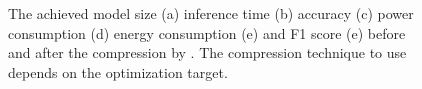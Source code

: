 \begin{figure}[!t]
\centering
{}
\hfill
{}
\hfill
{}
\hfill
{}
\hfill
{}
\hfill

\caption{The achieved model size (a) inference time (b) accuracy (c) power consumption (d)
energy consumption (e) and F1 score (e) before and after the compression by \quantization.
The compression technique to use depends on the optimization target.}
\label{fig:analy_quan}
\end{figure}



